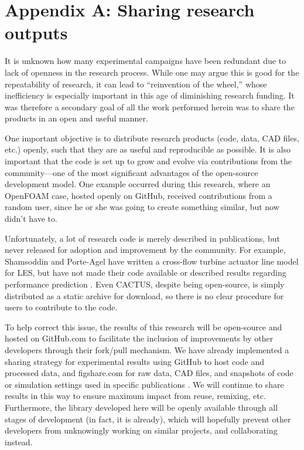 \chapter*{Appendix A: Sharing research outputs}

It is unknown how many experimental campaigns have been redundant due to lack of
openness in the research process. While one may argue this is good for the
repeatability of research, it can lead to ``reinvention of the wheel,'' whose
inefficiency is especially important in this age of diminishing research
funding. It was therefore a secondary goal of all the work performed herein was
to share the products in an open and useful manner.

One important objective is to distribute research products (code, data, CAD
files, etc.) openly, such that they are as useful and reproducible as possible.
It is also important that the code is set up to grow and evolve via
contributions from the community---one of the most significant advantages of the
open-source development model. One example occurred during this research, where
an OpenFOAM case, hosted openly on GitHub, received contributions from a random
user, since he or she was going to create something similar, but now didn't have
to.

Unfortunately, a lot of research code is merely described in publications, but
never released for adoption and improvement by the community. For example,
Shamsoddin and Porte-Agel have written a cross-flow turbine actuator line model
for LES, but have not made their code available or described results regarding
performance prediction \cite{Shamsoddin2014}. Even CACTUS, despite being
open-source, is simply distributed as a static archive for download, so there is
no clear procedure for users to contribute to the code.

To help correct this issue, the results of this research will be open-source and
hosted on GitHub.com to facilitate the inclusion of improvements by other
developers through their fork/pull mechanism. We have already implemented a
sharing strategy for experimental results using GitHub to host code and
processed data, and figshare.com for raw data, CAD files, and snapshots of code
or simulation settings used in specific publications
\cite{Bachant2014-RVAT-baseline, Bachant2014-RVAT-CAD,
Bachant2014-OF-AS-case-files, Bachant2015-RVAT-Re-dep-data}. We will continue to
share results in this way to ensure maximum impact from reuse, remixing, etc.
Furthermore, the library developed here will be openly available through all
stages of development (in fact, it is already), which will hopefully prevent
other developers from unknowingly working on similar projects, and collaborating
instead.
